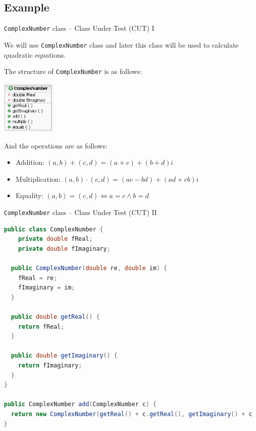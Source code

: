 \documentclass[11pt, xcolor=svgnames]{beamer}
\begin{document}

\subsection{Example}



\begin{frame}[fragile]{\texttt{ComplexNumber} class -- Class Under Test (CUT) I}

We will use \texttt{ComplexNumber} class and later this class will be used to calculate quadratic equations.

The structure of \texttt{ComplexNumber} is as follows:

\begin{center}
 \includegraphics[width=75pt]{./figs/ComplexNumber}
\end{center}

And the operations are as follows:

\begin{itemize}
 \item Addition: $(a,b)+(c,d)=(a+c)+(b+d)i$
 \item Multiplication: $(a,b)\cdot(c,d)=(ac-bd) + (ad+cb)i$
 \item Equality: $(a,b)=(c,d) \Leftrightarrow a=c \wedge b=d$
\end{itemize}

\end{frame}




\begin{frame}[fragile]{\texttt{ComplexNumber} class -- Class Under Test (CUT) II}



\begin{lstlisting}[language=Java,basicstyle=\scriptsize]
public class ComplexNumber {
    private double fReal;
    private double fImaginary;

  public ComplexNumber(double re, double im) {
    fReal = re;
    fImaginary = im;
  }

  public double getReal() {
    return fReal;
  }

  public double getImaginary() {
    return fImaginary;
  }
}

public ComplexNumber add(ComplexNumber c) {
  return new ComplexNumber(getReal() + c.getReal(), getImaginary() + c.getImaginary());
}
\end{lstlisting}

\end{frame}
\end{document}
